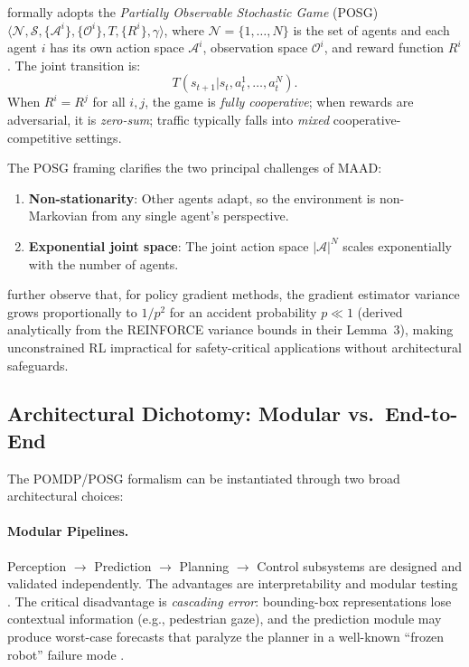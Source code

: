 \documentclass[12pt, a4paper]{article}
\begin{document}
\citet{palanisamy2020multi} formally adopts the \emph{Partially Observable
Stochastic Game} (POSG) $\langle \mathcal{N}, \mathcal{S}, \{\mathcal{A}^i\},
\{\mathcal{O}^i\}, T, \{R^i\}, \gamma \rangle$, where $\mathcal{N} =
\{1,\dots,N\}$ is the set of agents and each agent $i$ has its own action space
$\mathcal{A}^i$, observation space $\mathcal{O}^i$, and reward function $R^i$.
The joint transition is:
\begin{equation}
  T(s_{t+1} | s_t, a^1_t, \dots, a^N_t).
\end{equation}
When $R^i = R^j$ for all $i, j$, the game is \emph{fully cooperative}; when
rewards are adversarial, it is \emph{zero-sum}; traffic typically falls into
\emph{mixed} cooperative-competitive settings.

The POSG framing clarifies the two principal challenges of MAAD:
\begin{enumerate}[noitemsep]
  \item \textbf{Non-stationarity}: Other agents adapt, so the environment is
        non-Markovian from any single agent's perspective.
  \item \textbf{Exponential joint space}: The joint action space
        $|\mathcal{A}|^N$ scales exponentially with the number of agents.
\end{enumerate}

\citet{shalev2016safe} further observe that, for policy gradient methods,
the gradient estimator variance grows proportionally to $1/p^2$ for an accident
probability $p \ll 1$ (derived analytically from the REINFORCE variance bounds
in their Lemma~3), making unconstrained RL impractical for safety-critical
applications without architectural safeguards.

\subsection{Architectural Dichotomy: Modular vs.\ End-to-End}
The POMDP/POSG formalism can be instantiated through two broad architectural
choices:

\paragraph{Modular Pipelines.}
Perception $\to$ Prediction $\to$ Planning $\to$ Control subsystems are designed
and validated independently. The advantages are interpretability and modular
testing \citep{caesar2021nuplan}. The critical disadvantage is \emph{cascading
error}: bounding-box representations lose contextual information (e.g., pedestrian
gaze), and the prediction module may produce worst-case forecasts that paralyze
the planner in a well-known ``frozen robot'' failure mode \citep{song2020pip}.
\end{document}
